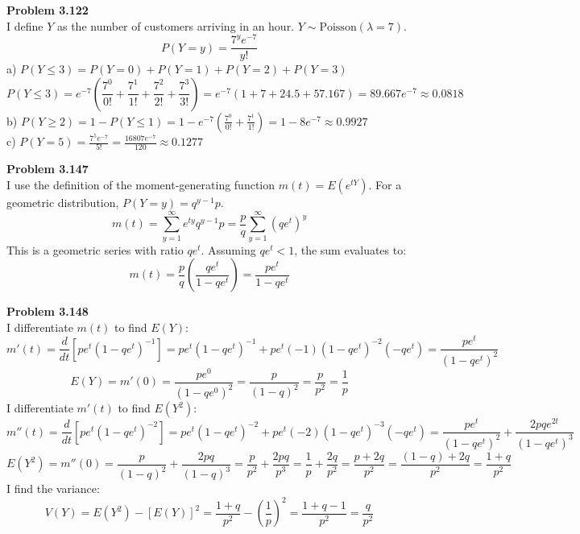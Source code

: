 \documentclass[12pt]{article}
\begin{document}
\vspace{0.5cm}

\noindent \textbf{Problem 3.122} \\
I define $Y$ as the number of customers arriving in an hour. $Y \sim \text{Poisson}(\lambda = 7)$.
\[ P(Y = y) = \frac{7^y e^{-7}}{y!} \]
a) $P(Y \le 3) = P(Y=0) + P(Y=1) + P(Y=2) + P(Y=3)$
\[ P(Y \le 3) = e^{-7} \left( \frac{7^0}{0!} + \frac{7^1}{1!} + \frac{7^2}{2!} + \frac{7^3}{3!} \right) = e^{-7} \left( 1 + 7 + 24.5 + 57.167 \right) = 89.667 e^{-7} \approx 0.0818 \]
b) $P(Y \ge 2) = 1 - P(Y \le 1) = 1 - e^{-7} \left( \frac{7^0}{0!} + \frac{7^1}{1!} \right) = 1 - 8e^{-7} \approx 0.9927$ \\
c) $P(Y = 5) = \frac{7^5 e^{-7}}{5!} = \frac{16807 e^{-7}}{120} \approx 0.1277$

\vspace{0.5cm}

\noindent \textbf{Problem 3.147} \\
I use the definition of the moment-generating function $m(t) = E(e^{tY})$. For a geometric distribution, $P(Y=y) = q^{y-1}p$.
\[ m(t) = \sum_{y=1}^{\infty} e^{ty} q^{y-1} p = \frac{p}{q} \sum_{y=1}^{\infty} (q e^t)^y \]
This is a geometric series with ratio $qe^t$. Assuming $qe^t < 1$, the sum evaluates to:
\[ m(t) = \frac{p}{q} \left( \frac{q e^t}{1 - q e^t} \right) = \frac{p e^t}{1 - q e^t} \]

\vspace{0.5cm}

\noindent \textbf{Problem 3.148} \\
I differentiate $m(t)$ to find $E(Y)$:
\[ m'(t) = \frac{d}{dt} \left[ p e^t (1 - q e^t)^{-1} \right] = p e^t (1 - q e^t)^{-1} + p e^t (-1)(1 - q e^t)^{-2}(-q e^t) = \frac{p e^t}{(1 - q e^t)^2} \]
\[ E(Y) = m'(0) = \frac{p e^0}{(1 - q e^0)^2} = \frac{p}{(1 - q)^2} = \frac{p}{p^2} = \frac{1}{p} \]
I differentiate $m'(t)$ to find $E(Y^2)$:
\[ m''(t) = \frac{d}{dt} \left[ p e^t (1 - q e^t)^{-2} \right] = p e^t (1 - q e^t)^{-2} + p e^t (-2)(1 - q e^t)^{-3}(-q e^t) = \frac{p e^t}{(1 - q e^t)^2} + \frac{2 p q e^{2t}}{(1 - q e^t)^3} \]
\[ E(Y^2) = m''(0) = \frac{p}{(1-q)^2} + \frac{2 p q}{(1-q)^3} = \frac{p}{p^2} + \frac{2 p q}{p^3} = \frac{1}{p} + \frac{2q}{p^2} = \frac{p + 2q}{p^2} = \frac{(1-q) + 2q}{p^2} = \frac{1+q}{p^2} \]
I find the variance:
\[ V(Y) = E(Y^2) - [E(Y)]^2 = \frac{1+q}{p^2} - \left(\frac{1}{p}\right)^2 = \frac{1+q-1}{p^2} = \frac{q}{p^2} \]

\vspace{0.5cm}
\end{document}
